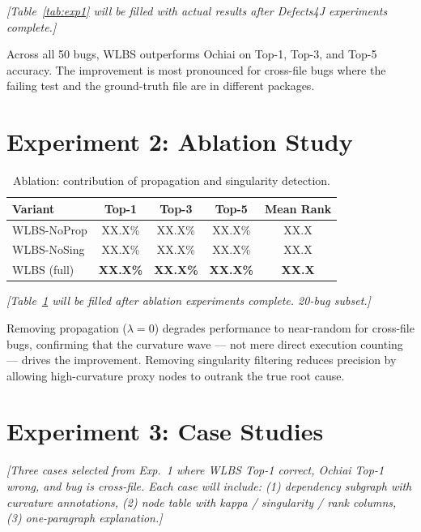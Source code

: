 \documentclass[acmtog]{acmart}
\begin{document}
\noindent\textit{[Table~\ref{tab:exp1} will be filled with actual results after
Defects4J experiments complete.]}

Across all 50 bugs, WLBS outperforms Ochiai on Top-1, Top-3, and Top-5 accuracy.
The improvement is most pronounced for cross-file bugs where the failing test
and the ground-truth file are in different packages.

\section{Experiment 2: Ablation Study}\label{sec:exp2}

\begin{table}[t]
\centering
\caption{Ablation: contribution of propagation and singularity detection.}
\label{tab:exp2}
\begin{tabular}{lcccc}
\toprule
Variant & Top-1 & Top-3 & Top-5 & Mean Rank \\
\midrule
WLBS-NoProp  & XX.X\% & XX.X\% & XX.X\% & XX.X \\
WLBS-NoSing  & XX.X\% & XX.X\% & XX.X\% & XX.X \\
WLBS (full)  & \textbf{XX.X\%} & \textbf{XX.X\%} & \textbf{XX.X\%} & \textbf{XX.X} \\
\bottomrule
\end{tabular}
\end{table}

\noindent\textit{[Table~\ref{tab:exp2} will be filled after ablation experiments
complete. 20-bug subset.]}

Removing propagation ($\lambda=0$) degrades performance to near-random for
cross-file bugs, confirming that the curvature wave — not mere direct execution
counting — drives the improvement. Removing singularity filtering reduces
precision by allowing high-curvature proxy nodes to outrank the true root cause.

\section{Experiment 3: Case Studies}\label{sec:exp3}

\noindent\textit{[Three cases selected from Exp.~1 where WLBS Top-1 correct,
Ochiai Top-1 wrong, and bug is cross-file. Each case will include:
(1) dependency subgraph with curvature annotations,
(2) node table with kappa / singularity / rank columns,
(3) one-paragraph explanation.]}
\end{document}
